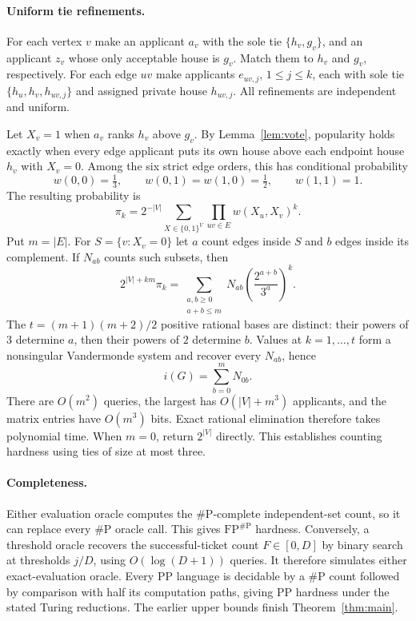 \documentclass[11pt]{article}
\newcommand{\PP}{\mathrm{PP}}
\newcommand{\FP}{\mathrm{FP}}
\newcommand{\sharpP}{\#\mathrm P}
\begin{document}
\paragraph{Uniform tie refinements.}
For each vertex $v$ make an applicant $a_v$ with the sole tie $\{h_v,g_v\}$, and an applicant $z_v$ whose only acceptable house is $g_v$. Match them to $h_v$ and $g_v$, respectively. For each edge $uv$ make applicants $e_{uv,j}$, $1\leq j\leq k$, each with sole tie $\{h_u,h_v,h_{uv,j}\}$ and assigned private house $h_{uv,j}$. All refinements are independent and uniform.

Let $X_v=1$ when $a_v$ ranks $h_v$ above $g_v$. By Lemma~\ref{lem:vote}, popularity holds exactly when every edge applicant puts its own house above each endpoint house $h_v$ with $X_v=0$. Among the six strict edge orders, this has conditional probability
\[
 w(0,0)=\tfrac13,\qquad w(0,1)=w(1,0)=\tfrac12,
 \qquad w(1,1)=1.
\]
The resulting probability is
\begin{equation}\label{eq:spin}
 \pi_k=2^{-|V|}\sum_{X\in\{0,1\}^V}\prod_{uv\in E}w(X_u,X_v)^k.
\end{equation}
Put $m=|E|$. For $S=\{v:X_v=0\}$ let $a$ count edges inside $S$ and $b$ edges inside its complement. If $N_{ab}$ counts such subsets, then
\begin{equation}\label{eq:interp}
 2^{|V|+km}\pi_k
 =\sum_{\substack{a,b\geq0\\a+b\leq m}}
 N_{ab}\left(\frac{2^{a+b}}{3^a}\right)^k.
\end{equation}
The $t=(m+1)(m+2)/2$ positive rational bases are distinct: their powers of $3$ determine $a$, then their powers of $2$ determine $b$. Values at $k=1,\ldots,t$ form a nonsingular Vandermonde system and recover every $N_{ab}$, hence
\[
 i(G)=\sum_{b=0}^m N_{0b}.
\]
There are $O(m^2)$ queries, the largest has $O(|V|+m^3)$ applicants, and the matrix entries have $O(m^3)$ bits. Exact rational elimination therefore takes polynomial time. When $m=0$, return $2^{|V|}$ directly. This establishes counting hardness using ties of size at most three.

\paragraph{Completeness.}
Either evaluation oracle computes the $\sharpP$-complete independent-set count, so it can replace every $\sharpP$ oracle call. This gives $\FP^{\sharpP}$ hardness. Conversely, a threshold oracle recovers the successful-ticket count $F\in[0,D]$ by binary search at thresholds $j/D$, using $O(\log(D+1))$ queries. It therefore simulates either exact-evaluation oracle. Every $\PP$ language is decidable by a $\sharpP$ count followed by comparison with half its computation paths, giving $\PP$ hardness under the stated Turing reductions. The earlier upper bounds finish Theorem~\ref{thm:main}.
\end{document}
